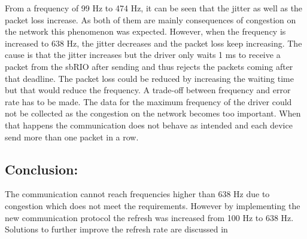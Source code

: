 From a frequency of 99 Hz to 474 Hz, it can be seen that the jitter as well as the packet loss increase. As both of them are mainly consequences of congestion on the network\cite{cisco_jitter} this phenomenon was expected. However, when the frequency is increased to 638 Hz, the jitter decreases and the packet loss keep increasing. The cause is that the jitter increases but the driver only waits 1 ms to receive a packet from the sbRIO after sending and thus rejects the packets coming after that deadline. The packet loss could be reduced by increasing the waiting time but that would reduce the frequency. A trade-off between frequency and error rate has to be made.
The data for the maximum frequency of the driver could not be collected as the congestion on the network becomes too important. When that happens the communication does not behave as intended and each device send more than one packet in a row.

\subsection*{Conclusion:}

The communication cannot reach frequencies higher than 638 Hz due to congestion which does not meet the requirements. However by implementing the new communication protocol the refresh was increased from 100 Hz to 638 Hz. Solutions to further improve the refresh rate are discussed in 
